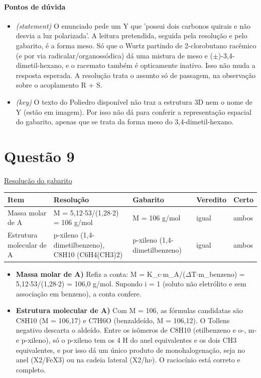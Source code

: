 \documentclass{article}%
\begin{document}
\paragraph{Pontos de dúvida}%
\begin{itemize}%
\item%
\textit{(statement)} O enunciado pede um Y que 'possui dois carbonos quirais e não desvia a luz polarizada'. A leitura pretendida, seguida pela resolução e pelo gabarito, é a forma meso. Só que o Wurtz partindo de 2{-}clorobutano racêmico (e por via radicalar/organossódica) dá uma mistura de meso e ($\pm$){-}3,4{-}dimetil{-}hexano, e o racemato também é opticamente inativo. Isso não muda a resposta esperada. A resolução trata o assunto só de passagem, na observação sobre o acoplamento R + S.%
\item%
\textit{(key)} O texto do Poliedro disponível não traz a estrutura 3D nem o nome de Y (estão em imagem). Por isso não dá para conferir a representação espacial do gabarito, apenas que se trata da forma meso do 3,4{-}dimetil{-}hexano.%
\end{itemize}%
\section*{Questão 9}%
\href{https://poliedroresolve.sistemapoliedro.com.br/vestibulares/ime/2027/ime-2-fase-dia-3-28-10-2026-2-fase-dia-3/dissertativa-9-quimica-2-fase-dia-3-ime-2027}{Resolução do gabarito}\par\smallskip%
\begin{longtable}{@{}p{} p{} p{} p{} p{}@{}}\toprule Item & Resolução & Gabarito & Veredito & Certo \\ \midrule
Massa molar de A & M = 5,12$\cdot$53/(1,28$\cdot$2) = 106 g/mol & M = 106 g/mol & igual & ambos \\
Estrutura molecular de A & p{-}xileno (1,4{-}dimetilbenzeno), C8H10 (C6H4(CH3)2) & p{-}xileno (1,4{-}dimetilbenzeno) & igual & ambos \\
\bottomrule\end{longtable}%
\begin{itemize}%
\item%
\textbf{Massa molar de A)} Refiz a conta: M = K\_c$\cdot$m\_A/($\Delta$T$\cdot$m\_benzeno) = 5,12$\cdot$53/(1,28$\cdot$2) = 106,0 g/mol. Supondo i = 1 (soluto não eletrólito e sem associação em benzeno), a conta confere.%
\item%
\textbf{Estrutura molecular de A)} Com M = 106, as fórmulas candidatas são C8H10 (M = 106,17) e C7H6O (benzaldeído, M = 106,12). O Tollens negativo descarta o aldeído. Entre os isômeros de C8H10 (etilbenzeno e o{-}, m{-} e p{-}xileno), só o p{-}xileno tem os 4 H do anel equivalentes e os dois CH3 equivalentes, e por isso dá um único produto de monohalogenação, seja no anel (X2/FeX3) ou na cadeia lateral (X2/h$\nu$). O raciocínio está correto e completo.%
\end{itemize}%
\end{document}
